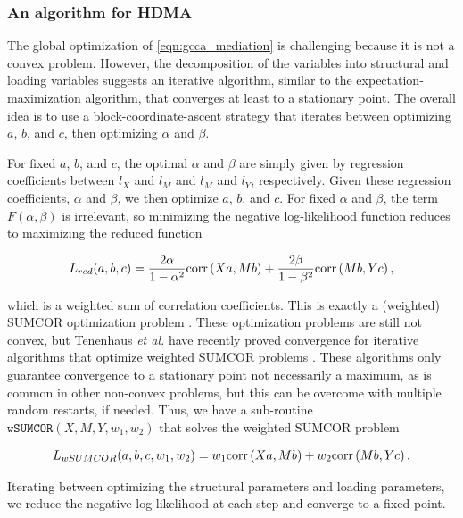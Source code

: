 \documentclass[
]{article}
\begin{document}
\subsubsection{An algorithm for HDMA}\label{an-algorithm-for-hdma}

The global optimization of \ref{eqn:gcca_mediation} is challenging
because it is not a convex problem. However, the decomposition of the
variables into structural and loading variables suggests an iterative
algorithm, similar to the expectation-maximization algorithm, that
converges at least to a stationary point. The overall idea is to use a
block-coordinate-ascent strategy that iterates between optimizing \(a\),
\(b\), and \(c\), then optimizing \(\alpha\) and \(\beta\).

For fixed \(a\), \(b\), and \(c\), the optimal \(\alpha\) and \(\beta\)
are simply given by regression coefficients between \(l_X\) and \(l_M\)
and \(l_M\) and \(l_Y\), respectively. Given these regression
coefficients, \(\alpha\) and \(\beta\), we then optimize \(a\), \(b\),
and \(c\). For fixed \(\alpha\) and \(\beta\), the term
\(F(\alpha, \beta)\) is irrelevant, so minimizing the negative
log-likelihood function reduces to maximizing the reduced function

\begin{align}
L_{red}(a,b,c) = \frac{2\alpha}{1-\alpha^2} {\rm corr}\left(Xa, Mb\right) + \frac{2\beta}{1-\beta^2} {\rm corr}\left(Mb, Yc\right),
\end{align}

which is a weighted sum of correlation coefficients. This is exactly a
(weighted) SUMCOR optimization problem \cite{tenenhaus2011regularized}.
These optimization problems are still not convex, but Tenenhaus
\textit{et al.} have recently proved convergence for iterative
algorithms that optimize weighted SUMCOR problems
\cite{tenenhaus2011regularized,
tenenhaus2017regularized, tenenhaus2015kernel}. These algorithms only
guarantee convergence to a stationary point not necessarily a maximum,
as is common in other non-convex problems, but this can be overcome with
multiple random restarts, if needed. Thus, we have a sub-routine
\(\texttt{wSUMCOR}(X, M, Y, w_1, w_2)\) that solves the weighted SUMCOR
problem

\begin{align}
L_{wSUMCOR}(a,b,c, w_1, w_2) = w_1 {\rm corr}\left(Xa, Mb\right) + w_2 {\rm corr}\left(Mb, Yc\right).
\end{align}

Iterating between optimizing the structural parameters and loading
parameters, we reduce the negative log-likelihood at each step and
converge to a fixed point.
\end{document}
